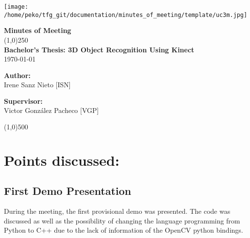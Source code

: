 \documentclass{article}
\newenvironment{myindentpar}[1]%
 {\begin{list}{}%
         {\setlength{\leftmargin}{#1}}%
         \item[]%
 }
 {\end{list}}
\begin{document}
\texttt{[image: /home/peko/tfg\_git/documentation/minutes\_of\_meeting/template/uc3m.jpg]}

\vspace{-1cm}
\begin{minipage}[b]{1\linewidth}
	\begin{center}
	{\Huge \bfseries{Minutes of Meeting}}\\
	\line(1,0){250}\\[1cm]
	{\LARGE \textbf{Bachelor's Thesis: 3D Object Recognition Using Kinect}}\\[0.5cm]
	{\large \today}
	\end{center}
\end {minipage}



\begin{minipage}{0.55\textwidth}
\begin{flushleft} \large
\textbf{{Author:}\\}
Irene Sanz Nieto [ISN]\\
\end{flushleft}
\end{minipage}
\begin{minipage}{0.4\textwidth}
\begin{flushright} \large
\textbf{Supervisor: }\\
Victor González Pacheco [VGP]
\end{flushright}\end{minipage}

\begin{center}
\line(1,0){500}
\end{center}

\renewcommand{\thesubsection}
{\hspace*{1cm} \arabic{section}.\arabic{subsection}}



\section{\LARGE Points discussed: }
	\subsection{First Demo Presentation}
	
		\begin{myindentpar}{1cm} 
			During the meeting, the first provisional demo was presented. The code was discussed as well as the possibility of changing the language programming from Python to C++ due to the lack of information of the OpenCV python bindings. 
		\end{myindentpar}
		
\end{document}
